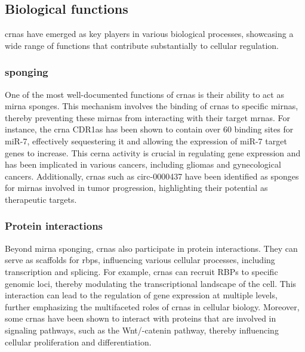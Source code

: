 \subsection{Biological functions}
\label{sec:circrna_functions}
\glspl{crna} have emerged as key players in various biological processes,
showcasing
a wide range of functions that contribute substantially to cellular regulation.

\subsubsection{ sponging}
One of the most well-documented functions of \glspl{crna} is their ability to
act as \gls{mirna} sponges.
This mechanism involves the binding of \glspl{crna} to specific \glspl{mirna},
thereby preventing these \glspl{mirna} from interacting with their target
\glspl{mrna}.
For instance, the \gls{crna} CDR1as has been shown to contain over 60 binding
sites for miR-7, effectively sequestering it and allowing the expression of
miR-7 target genes to
increase\supercite{guo_expanded_2014,yuan_regulatory_2020}.
This \gls{cerna} activity is crucial in regulating gene expression and has been
implicated in various cancers, including gliomas and gynecological
cancers\supercite{dong_expression_2020,song_circular_2016}.
Additionally, \glspl{crna} such as circ-0000437 have been identified as sponges
for \glspl{mirna} involved in tumor progression, highlighting their potential
as therapeutic targets\supercite{li_peptide_2021,cui_circular_2022}.

\subsubsection{Protein interactions}
Beyond \gls{mirna} sponging, \glspl{crna} also participate in protein
interactions.
They can serve as scaffolds for \glspl{rbp}, influencing various cellular
processes, including transcription and
splicing\supercite{li_comprehensive_2017,qu_emerging_2017}.
For example, \glspl{crna} can recruit RBPs to specific genomic loci, thereby
modulating the transcriptional landscape of the
cell\supercite{li_comprehensive_2017}.
This interaction can lead to the regulation of gene expression at multiple
levels, further emphasizing the multifaceted roles of \glspl{crna} in cellular
biology\supercite{zhang_important_2024,he_targeting_2021}.
Moreover, some \glspl{crna} have been shown to interact with proteins that are
involved in signaling pathways, such as the Wnt/\textbeta{}-catenin pathway,
thereby influencing cellular proliferation and
differentiation\supercite{peng_novel_2021}.

